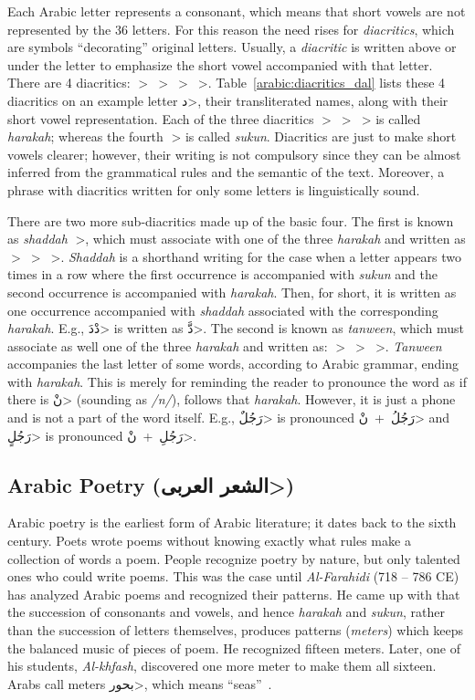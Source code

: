\documentclass[journal,10pt,twocolumns,letter]{IEEEtran}
\begin{document}
Each Arabic letter represents a consonant, which means that short vowels are not represented by the
36 letters. For this reason the need rises for \textit{diacritics}, which are symbols ``decorating''
original letters. Usually, a \textit{diacritic} is written above or under the letter to emphasize the
short vowel accompanied with that letter. There are 4 diacritics: \mbox{\<◌َ> \<◌ُ>
  \<◌ِ> \<◌ْ>}. Table~\ref{arabic:diacritics_dal} lists these 4 diacritics on an
example letter \<د>, their transliterated names, along with their short vowel
representation. Each of the three diacritics \mbox{\<◌َ> \<◌ُ> \<◌ِ>} is called \textit{harakah}; whereas the fourth \<◌ْ> is called
\textit{sukun}. Diacritics are just to make short vowels clearer; however, their writing is not
compulsory since they can be almost inferred from the grammatical rules and the semantic of the
text. Moreover, a phrase with diacritics written for only some letters is linguistically sound.

There are two more sub-diacritics made up of the basic four. The first is known as \textit{shaddah}
\<◌ّ>, which must associate with one of the three \textit{harakah} and written as
\mbox{\<◌َّ> \<◌ُّ> \<◌ِّ>}. \textit{Shaddah} is a shorthand writing for the
case when a letter appears two times in a row where the first occurrence is accompanied with
\textit{sukun} and the second occurrence is accompanied with \textit{harakah}. Then, for short, it
is written as one occurrence accompanied with \textit{shaddah} associated with the corresponding
\textit{harakah}. E.g., \mbox{\<دْدَ>} is written as \<دَّ>. The second is known as
\textit{tanween}, which must associate as well one of the three \textit{harakah} and written as:
\mbox{\<◌ٍ> \<◌ٌ> \<◌ً>}. \textit{Tanween} accompanies the last letter of
some words, according to Arabic grammar, ending with \textit{harakah}. This is merely for reminding
the reader to pronounce the word as if there is \<نْ> (sounding as \textit{/n/}), follows
that \textit{harakah}. However, it is just a phone and is not a part of the word itself. E.g.,
\<رَجُلٌ> is pronounced \mbox{\<رَجُلُ + نْ>} and \<رَجُلٍ> is pronounced
\mbox{\<رَجُلِ + نْ>}.


\subsection{Arabic Poetry (\<الشعر العربى>)}\label{sec:arab-poetry-text}
Arabic poetry is the earliest form of Arabic literature; it dates back to the sixth century. Poets
wrote poems without knowing exactly what rules make a collection of words a poem. People recognize
poetry by nature, but only talented ones who could write poems. This was the case until
\textit{Al-Farahidi} (718 – 786 CE) has analyzed Arabic poems and recognized their patterns. He came
up with that the succession of consonants and vowels, and hence \textit{harakah} and \textit{sukun},
rather than the succession of letters themselves, produces patterns (\textit{meters}) which keeps
the balanced music of pieces of poem. He recognized fifteen meters. Later, one of his students,
\textit{Al-khfash}, discovered one more meter to make them all sixteen. Arabs call meters
\<بحور>, which means ``seas''~\cite{Moustafa}.
\end{document}
